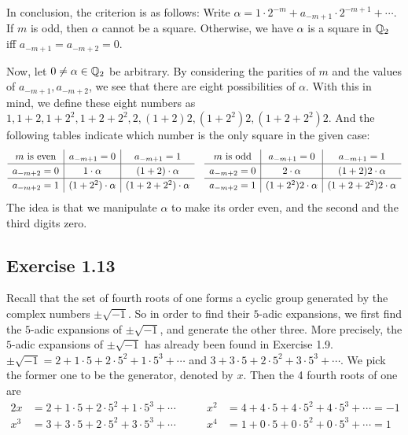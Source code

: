 \documentclass[../Koblitz.tex]{subfiles}
\begin{document}
In conclusion, the criterion is as follows: Write $\alpha=1\cdot2^{-m}+a_{-m+1}\cdot2^{-m+1}+\cdots$. If $m$ is odd, then $\alpha$ cannot be a square. Otherwise, we have $\alpha$ is a square in $\mathbb{Q}_2$ iff $a_{-m+1}=a_{-m+2}=0$.

Now, let $0\neq\alpha\in\mathbb{Q}_2$ be arbitrary. By considering the parities of $m$ and the values of $a_{-m+1},a_{-m+2}$, we see that there are eight possibilities of $\alpha$. With this in mind, we define these eight numbers as $1,1+2,1+2^2,1+2+2^2,2,(1+2)2,(1+2^2)2,(1+2+2^2)2$. And the following tables indicate which number is the only square in the given case:
$$
\def\arraystretch{1.2}
\begin{array}{c|c|c}
    m \text{ is even} & a_{-m+1}=0 & a_{-m+1}=1 \\
    \hline
    a_{-m+2}=0 & 1\cdot\alpha & (1+2)\cdot\alpha \\
    \hline
    a_{-m+2}=1 & (1+2^2)\cdot\alpha & (1+2+2^2)\cdot\alpha
\end{array}
\quad
\begin{array}{c|c|c}
    m \text{ is odd} & a_{-m+1}=0 & a_{-m+1}=1 \\
    \hline
    a_{-m+2}=0 & 2\cdot\alpha & (1+2)2\cdot\alpha \\
    \hline
    a_{-m+2}=1 & (1+2^2)2\cdot\alpha & (1+2+2^2)2\cdot\alpha
\end{array}
$$
The idea is that we manipulate $\alpha$ to make its order even, and the second and the third digits zero.

\subsection*{Exercise 1.13}

Recall that the set of fourth roots of one forms a cyclic group generated by the complex numbers $\pm\sqrt{-1}$. So in order to find their $5$-adic expansions, we first find the $5$-adic expansions of $\pm\sqrt{-1}$, and generate the other three. More precisely, the $5$-adic expansions of $\pm\sqrt{-1}$ has already been found in Exercise 1.9. $\pm\sqrt{-1}=2+1\cdot5+2\cdot5^2+1\cdot5^3+\cdots$ and $3+3\cdot5+2\cdot5^2+3\cdot5^3+\cdots$. We pick the former one to be the generator, denoted by $x$. Then the 4 fourth roots of one are
\begin{alignat*}{2}
    x&=2+1\cdot5+2\cdot5^2+1\cdot5^3+\cdots &\qquad
    x^2&=4+4\cdot5+4\cdot5^2+4\cdot5^3+\cdots = -1\\
    x^3&=3+3\cdot5+2\cdot5^2+3\cdot5^3+\cdots &\qquad
    x^4&=1+0\cdot5+0\cdot5^2+0\cdot5^3+\cdots = 1
\end{alignat*}
\end{document}
